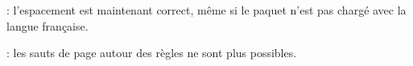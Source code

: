 \documentclass[12pt, a4paper]{article}
\begin{document}
\begin{tdocfix}
	\item {}: l'espacement est maintenant correct, même si le paquet  n'est pas chargé avec la langue française.

	\item {}: les sauts de page autour des règles ne sont plus possibles.
\end{tdocfix}
\end{document}
